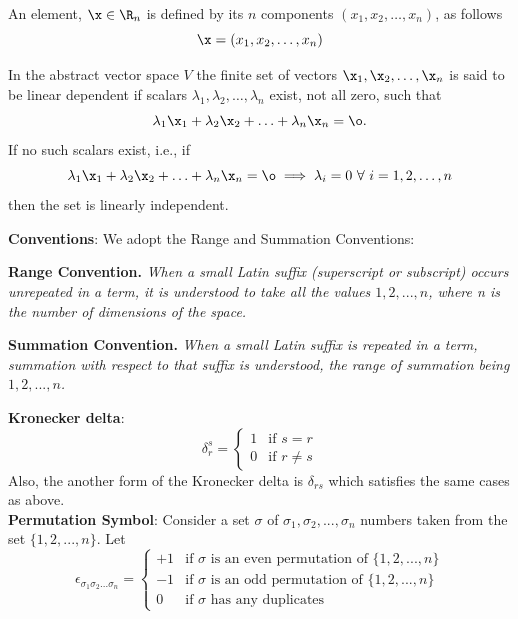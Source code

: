 \begin{definition}
An element, $\x \in \R_n$ is defined by its $n$ components $(x_1, x_2, \hdots, x_n)$, as follows
\[ \x = (x_1, x_2, \hdots, x_n) \]
\end{definition}

\begin{definition}
In the abstract vector space $V$ the finite set of vectors
$\x_1, \x_2, \hdots, \x_n$ is said to be linear dependent if scalars $\lambda_1, \lambda_2, \hdots, \lambda_n$ exist, not all zero, such that 
\[ \lambda_1 \x_1 + \lambda_2 \x_2 + \hdots + \lambda_n\x_n = \o.\] If no such scalars exist, i.e., if 
\[ \lambda_1 \x_1 + \lambda_2 \x_2 + \hdots + \lambda_n\x_n = \o \implies \lambda_i  = 0 ~\forall ~i = 1,2, \hdots, n\] then the set is linearly independent.  
\label{LinearDependence}
\end{definition}

{\bf Conventions}: We adopt the Range and Summation Conventions:
\begin{definition}
{\bf Range Convention.} {\it When a small Latin suffix (superscript or subscript) occurs unrepeated in a term, it is understood to take all the values
$1,2,...,n$, where n is the number of dimensions of the space.}
\end{definition}

\begin{definition}
{\bf Summation Convention.} {\it When a small Latin suffix is repeated in a term, summation with respect to that suffix is understood, the range of summation
being $1,2,...,n$.}
\end{definition}

{\bf Kronecker delta}:
\[ \delta^s_r = \begin{cases} 1 & \mbox{if } s = r \\0 & \mbox{if } r \ne s\end{cases} \]
Also, the another form of the Kronecker delta is $\delta_{rs}$ which satisfies the same cases as above. \\

{\bf Permutation Symbol}: Consider a set $\sigma$ of $\sigma_1, \sigma_2, ..., \sigma_n$ numbers taken from the set $\{1,2,...,n\}$. Let
\[ \epsilon_{\sigma_1\sigma_2...\sigma_n} =
\begin{cases}
+1 & \mbox{if }\sigma \mbox{ is an even permutation of $\{1, 2, ..., n\}$}\\
-1 & \mbox{if }\sigma \mbox{ is an odd permutation of $\{1, 2, ..., n\}$}\\
0 & \mbox{if }\sigma \mbox{ has any duplicates}
\end{cases} \]

